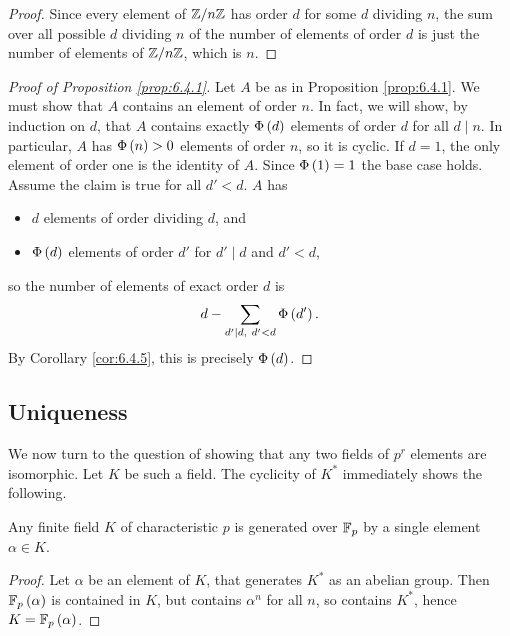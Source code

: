 \begin{proof}
Since every element of $ \mathbb{Z} / n\mathbb{Z} $ has order $ d $ for some $ d $ dividing $ n $, the sum over all possible $ d $ dividing $ n $ of the number of elements of order $ d $ is just the number of elements of $ \mathbb{Z} / n\mathbb{Z} $, which is $ n $.
\end{proof}

\begin{proof}[Proof of Proposition \ref{prop:6.4.1}]
Let $ A $ be as in Proposition \ref{prop:6.4.1}. We must show that $ A $ contains an element of order $ n $. In fact, we will show, by induction on $ d $, that $ A $ contains exactly $ \Phi\left( d \right) $ elements of order $ d $ for all $ d \mid n $. In particular, $ A $ has $ \Phi\left( n \right) > 0 $ elements of order $ n $, so it is cyclic. If $ d = 1 $, the only element of order one is the identity of $ A $. Since $ \Phi\left( 1 \right) = 1 $ the base case holds. Assume the claim is true for all $ d' < d $. $ A $ has
\begin{itemize}
\item $ d $ elements of order dividing $ d $, and
\item $ \Phi\left( d \right) $ elements of order $ d' $ for $ d' \mid d $ and $ d' < d $,
\end{itemize}
so the number of elements of exact order $ d $ is
$$ d - \sum_{d' \mid d, \ d' < d} \Phi\left( d' \right). $$
By Corollary \ref{cor:6.4.5}, this is precisely $ \Phi\left( d \right) $.
\end{proof}

\subsection{Uniqueness}

We now turn to the question of showing that any two fields of $ p^r $ elements are isomorphic. Let $ K $ be such a field. The cyclicity of $ K^* $ immediately shows the following.

\begin{proposition}
Any finite field $ K $ of characteristic $ p $ is generated over $ \mathbb{F}_p $ by a single element $ \alpha \in K $.
\end{proposition}

\begin{proof}
Let $ \alpha $ be an element of $ K $, that generates $ K^* $ as an abelian group. Then $ \mathbb{F}_p\left( \alpha \right) $ is contained in $ K $, but contains $ \alpha^n $ for all $ n $, so contains $ K^* $, hence $ K = \mathbb{F}_p\left( \alpha \right) $.
\end{proof}


